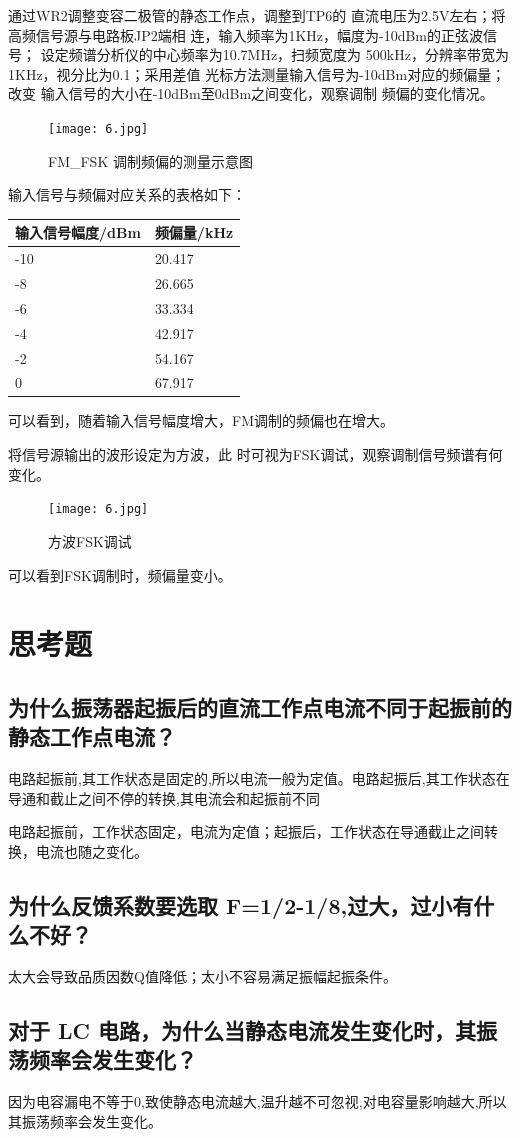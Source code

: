 \documentclass{../source/Experiment}
\begin{document}
通过WR2调整变容二极管的静态工作点，调整到TP6的
直流电压为2.5V左右；将高频信号源与电路板JP2端相
连，输入频率为1KHz，幅度为-10dBm的正弦波信号；
设定频谱分析仪的中心频率为10.7MHz，扫频宽度为
500kHz，分辨率带宽为1KHz，视分比为0.1；采用差值
光标方法测量输入信号为-10dBm对应的频偏量；改变
输入信号的大小在-10dBm至0dBm之间变化，观察调制
频偏的变化情况。
\begin{figure}[H]
    \centering
    \texttt{[image: 6.jpg]}
    \caption{FM\_FSK 调制频偏的测量示意图}
\end{figure}

输入信号与频偏对应关系的表格如下：
\begin{table}[H]
    \centering
    \begin{tabular}{|l|l|}
        \hline
        输入信号幅度/dBm & 频偏量/kHz \\ \hline
        -10              & 20.417     \\ \hline
        -8               & 26.665     \\ \hline
        -6               & 33.334     \\ \hline
        -4               & 42.917     \\ \hline
        -2               & 54.167     \\ \hline
        0                & 67.917     \\ \hline
    \end{tabular}
\end{table}
可以看到，随着输入信号幅度增大，FM调制的频偏也在增大。

将信号源输出的波形设定为方波，此
时可视为FSK调试，观察调制信号频谱有何变化。
\begin{figure}[H]
    \centering
    \texttt{[image: 6.jpg]}
    \caption{方波FSK调试}
\end{figure}

可以看到FSK调制时，频偏量变小。

\section{思考题}
\subsection{为什么振荡器起振后的直流工作点电流不同于起振前的静态工作点电流？}
电路起振前,其工作状态是固定的,所以电流一般为定值。电路起振后,其工作状态在导通和截止之间不停的转换,其电流会和起振前不同

电路起振前，工作状态固定，电流为定值；起振后，工作状态在导通截止之间转换，电流也随之变化。
\subsection{为什么反馈系数要选取 F=1/2-1/8,过大，过小有什么不好？}

太大会导致品质因数Q值降低；太小不容易满足振幅起振条件。
\subsection{对于 LC 电路，为什么当静态电流发生变化时，其振荡频率会发生变化？}
因为电容漏电不等于0,致使静态电流越大,温升越不可忽视,对电容量影响越大,所以其振荡频率会发生变化。
\end{document}
